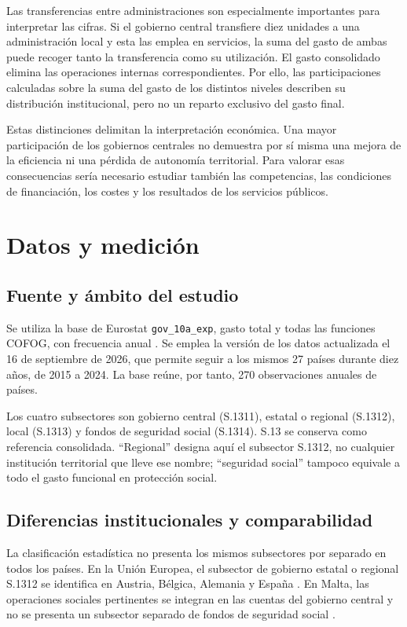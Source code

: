 \documentclass[11pt,a4paper]{article}
\begin{document}
Las transferencias entre administraciones son especialmente importantes para interpretar las cifras. Si el gobierno central transfiere diez unidades a una administración local y esta las emplea en servicios, la suma del gasto de ambas puede recoger tanto la transferencia como su utilización. El gasto consolidado elimina las operaciones internas correspondientes. Por ello, las participaciones calculadas sobre la suma del gasto de los distintos niveles describen su distribución institucional, pero no un reparto exclusivo del gasto final.

Estas distinciones delimitan la interpretación económica. Una mayor participación de los gobiernos centrales no demuestra por sí misma una mejora de la eficiencia ni una pérdida de autonomía territorial. Para valorar esas consecuencias sería necesario estudiar también las competencias, las condiciones de financiación, los costes y los resultados de los servicios públicos.

\section{Datos y medición}
\subsection{Fuente y ámbito del estudio}
Se utiliza la base de Eurostat \texttt{gov\_10a\_exp}, gasto total y todas las funciones COFOG, con frecuencia anual \cite{datos}. Se emplea la versión de los datos actualizada el 16 de septiembre de 2026, que permite seguir a los mismos 27 países durante diez años, de 2015 a 2024. La base reúne, por tanto, 270 observaciones anuales de países.

Los cuatro subsectores son gobierno central (S.1311), estatal o regional (S.1312), local (S.1313) y fondos de seguridad social (S.1314). S.13 se conserva como referencia consolidada. ``Regional'' designa aquí el subsector S.1312, no cualquier institución territorial que lleve ese nombre; ``seguridad social'' tampoco equivale a todo el gasto funcional en protección social.

\subsection{Diferencias institucionales y comparabilidad}
La clasificación estadística no presenta los mismos subsectores por separado en todos los países. En la Unión Europea, el subsector de gobierno estatal o regional S.1312 se identifica en Austria, Bélgica, Alemania y España \cite{sectores}. En Malta, las operaciones sociales pertinentes se integran en las cuentas del gobierno central y no se presenta un subsector separado de fondos de seguridad social \cite{malta}.
\end{document}
